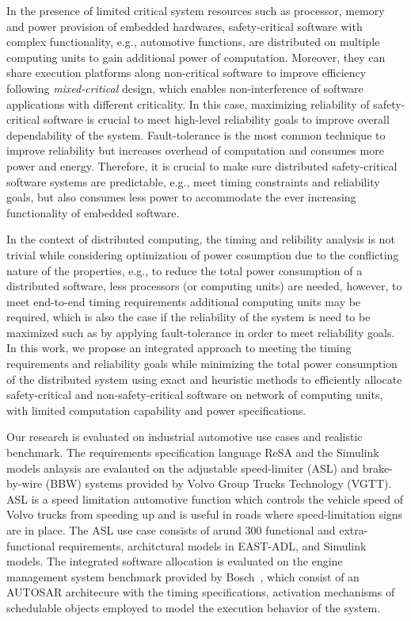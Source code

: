 In the presence of limited critical system resources such as processor, memory and power provision of embedded hardwares, safety-critical software with complex functionality, e.g., automotive functions, are distributed on multiple computing units to gain additional power of computation. Moreover, they can share execution platforms along non-critical software to improve efficiency following \textit{mixed-critical} design, which enables non-interference of software applications with different criticality. In this case, maximizing reliability of safety-critical software is crucial to meet high-level reliability goals to improve overall dependability of the system. Fault-tolerance is the most common technique to improve reliability but increases overhead of computation and consumes more power and energy. Therefore, it is crucial to make sure distributed safety-critical software systems are predictable, e.g., meet timing constraints and reliability goals, but also consumes less power to accommodate the ever increasing functionality of embedded software.

In the context of distributed computing, the timing and relibility analysis is not trivial while considering optimization of power cosumption due to the conflicting nature of the properties, e.g.,  to reduce the total power consumption of a distributed software, less processors (or computing units) are needed, however, to meet end-to-end timing requirements additional computing units may be required, which is also the case if the reliability of the system is need to be maximized such as by applying fault-tolerance in order to meet reliability goals. In this work, we propose an integrated approach to meeting the timing requirements and reliability goals while minimizing the total power consumption of the distributed system using exact and heuristic methods to efficiently allocate safety-critical and non-safety-critical software on network of computing units, with limited computation capability and power specifications.

Our research is evaluated on industrial automotive use cases and realistic benchmark. The requirements specification language ReSA and the Simulink models anlaysis are evalauted on the adjustable speed-limiter (ASL) and brake-by-wire (BBW) systems provided by Volvo Group Trucks Technology (VGTT). ASL is a speed limitation automotive function which controls the vehicle speed of Volvo trucks from speeding up and is useful in roads where speed-limitation signs are in place. The ASL use case consists of arund 300 functional and extra-functional requirements, architctural models in EAST-ADL, and Simulink models. The integrated software allocation is evaluated on the engine management system benchmark provided by Bosch~\cite{}, which consist of an AUTOSAR architecure with the timing specifications, activation mechanisms of schedulable objects employed to model the execution behavior of the system.


